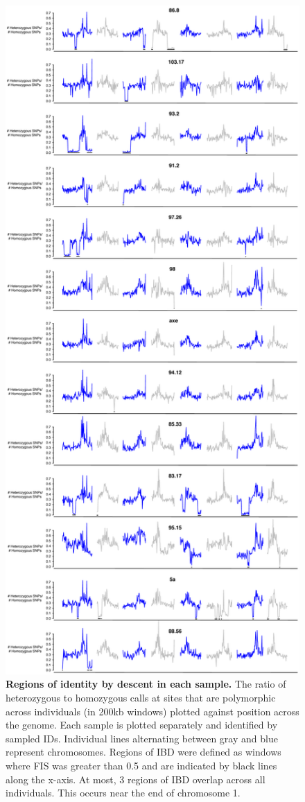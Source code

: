 \begin{figure}[ht!]
      \centering
       \includegraphics[scale=0.1]{Ch2FigS4}
    \caption{\textbf{Regions of identity by descent in each sample.} The ratio of heterozygous to homozygous calls at sites that are polymorphic across individuals (in 200kb windows) plotted against position across the genome. Each sample is plotted separately and identified by sampled IDs. Individual lines alternating between gray and blue represent chromosomes. Regions of IBD were defined as windows where FIS was greater than 0.5 and are indicated by black lines along the x-axis. At most, 3 regions of IBD overlap across all individuals. This occurs near the end of chromosome 1.}
    \label{fig:figS4}
\end{figure}

